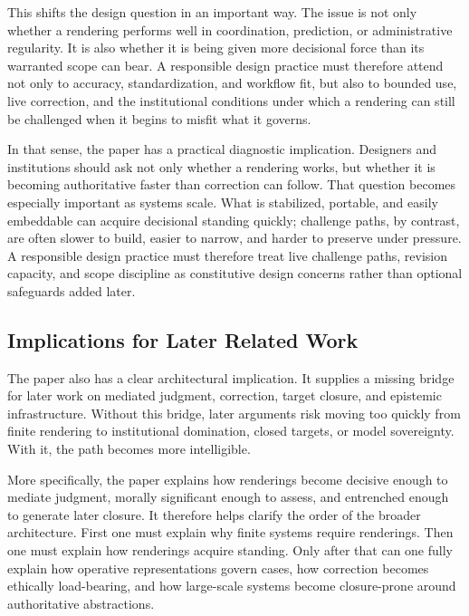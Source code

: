 \documentclass[11pt]{article}
\begin{document}
This shifts the design question in an important way. The issue is not only whether a rendering performs well in coordination, prediction, or administrative regularity. It is also whether it is being given more decisional force than its warranted scope can bear. A responsible design practice must therefore attend not only to accuracy, standardization, and workflow fit, but also to bounded use, live correction, and the institutional conditions under which a rendering can still be challenged when it begins to misfit what it governs.\cite{TimmermansEpstein2010WorldOfStandards,Power1997AuditSociety,MoynihanHerdHarvey2015AdministrativeBurden}

In that sense, the paper has a practical diagnostic implication. Designers and institutions should ask not only whether a rendering works, but whether it is becoming authoritative faster than correction can follow. That question becomes especially important as systems scale. What is stabilized, portable, and easily embeddable can acquire decisional standing quickly; challenge paths, by contrast, are often slower to build, easier to narrow, and harder to preserve under pressure. A responsible design practice must therefore treat live challenge paths, revision capacity, and scope discipline as constitutive design concerns rather than optional safeguards added later.

\subsection{Implications for Later Related Work}

The paper also has a clear architectural implication. It supplies a missing bridge for later work on mediated judgment, correction, target closure, and epistemic infrastructure. Without this bridge, later arguments risk moving too quickly from finite rendering to institutional domination, closed targets, or model sovereignty. With it, the path becomes more intelligible.\cite{Swanson2026ConstrainedDescribability,Swanson2026MediatedJudgmentConstraint,Swanson2026EmbeddedProcess}

More specifically, the paper explains how renderings become decisive enough to mediate judgment, morally significant enough to assess, and entrenched enough to generate later closure. It therefore helps clarify the order of the broader architecture. First one must explain why finite systems require renderings. Then one must explain how renderings acquire standing. Only after that can one fully explain how operative representations govern cases, how correction becomes ethically load-bearing, and how large-scale systems become closure-prone around authoritative abstractions.\cite{Swanson2026MediatedJudgmentConstraint}
\end{document}
